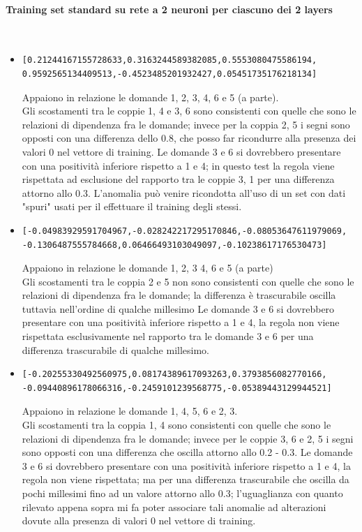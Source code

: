 \paragraph{Training set standard su rete a 2 neuroni per ciascuno dei 2 layers}\mbox{}
\label{Training set standard su rete a 2 neuroni per ciascuno dei 2 layers}
\\
\noindent
\begin{itemize}
\item \begin{verbatim}[0.21244167155728633,0.3163244589382085,0.5553080475586194,
0.9592565134409513,-0.4523485201932427,0.05451735176218134]\end{verbatim}
Appaiono in relazione le domande 1, 2, 3, 4, 6 e 5 (a parte).\\
Gli scostamenti tra le coppie 1, 4 e 3, 6 sono consistenti con quelle che sono le relazioni di dipendenza fra le domande; invece per la coppia 2, 5 i segni sono opposti con una differenza dello 0.8, che posso far ricondurre alla presenza dei valori 0 nel vettore di training.
Le domande 3 e 6 si dovrebbero presentare con una positivit\`a inferiore rispetto a 1 e 4; in questo test la regola viene rispettata ad esclusione del rapporto tra le coppie 3, 1 per una differenza attorno allo 0.3. L'anomalia pu\`o venire ricondotta all'uso di un set con dati "spuri" usati per il effettuare il training degli stessi.

\item \begin{verbatim}[-0.04983929591704967,-0.028242217295170846,-0.08053647611979069,
-0.1306487555784668,0.06466493103049097,-0.10238617176530473]
\end{verbatim}
Appaiono in relazione le domande 1, 2, 3  4, 6 e 5 (a parte)\\
Gli scostamenti tra le coppia 2 e 5 non sono consistenti con quelle che sono le relazioni di dipendenza fra le domande; la differenza \`e trascurabile oscilla tuttavia nell'ordine di qualche millesimo
Le domande 3 e 6 si dovrebbero presentare con una positivit\`a inferiore rispetto a 1 e 4, la regola  non viene rispettata esclusivamente nel rapporto tra le domande 3 e 6 per una differenza trascurabile di qualche millesimo.

\item \begin{verbatim}[-0.20255330492560975,0.08174389617093263,0.3793856082770166,
-0.09440896178066316,-0.2459101239568775,-0.05389443129944521]
\end{verbatim}
Appaiono in relazione le domande 1, 4, 5, 6 e 2, 3.\\
Gli scostamenti tra la coppia 1, 4 sono consistenti con quelle che sono le relazioni di dipendenza fra le domande; invece per le coppie 3, 6 e 2, 5 i segni sono opposti con una differenza che oscilla attorno allo 0.2 - 0.3.
Le domande 3 e 6 si dovrebbero presentare con una positivit\`a inferiore rispetto a 1 e 4, la regola non viene rispettata; ma per una differenza trascurabile che oscilla da pochi millesimi fino ad un valore attorno allo 0.3; l'uguaglianza con quanto rilevato appena sopra mi fa poter associare tali anomalie ad alterazioni dovute alla presenza di valori 0 nel vettore di training.


\end{itemize}

